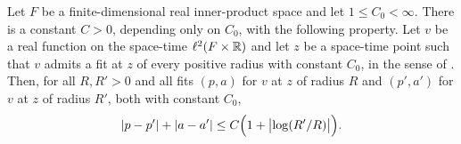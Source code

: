 \begin{lemma}
Let $F$ be a finite-dimensional real inner-product space and let
$1\le C_0<\infty$. There is a constant $C>0$, depending only on $C_0$, with the
following property. Let $v$ be a real function on the space-time
$\ell^2(F\times\mathbb{R})$ and let $z$ be a space-time point such that $v$ admits a
fit at $z$ of every positive radius with constant $C_0$, in the sense of
. Then, for all $R,R'>0$ and all fits $(p,a)$ for $v$ at $z$ of
radius $R$ and $(p',a')$ for $v$ at $z$ of radius $R'$, both with constant
$C_0$,
\begin{equation}\label{eq:origin-fit-bound}
  |p-p'|+|a-a'|\le C\Bigl(1+\bigl|\log(R'/R)\bigr|\Bigr).
\end{equation}
\end{lemma}
